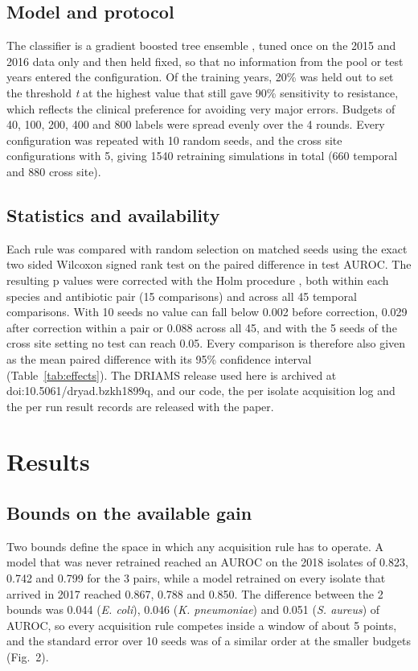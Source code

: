 \documentclass[conference,a4paper]{IEEEtran}
\begin{document}
\subsection{Model and protocol}

The classifier is a gradient boosted tree ensemble \cite{r19}, tuned once on the 2015 and 2016 data only and then held fixed, so that no information from the pool or test years entered the configuration. Of the training years, 20\% was held out to set the threshold \textit{t} at the highest value that still gave 90\% sensitivity to resistance, which reflects the clinical preference for avoiding very major errors. Budgets of 40, 100, 200, 400 and 800 labels were spread evenly over the 4 rounds. Every configuration was repeated with 10 random seeds, and the cross site configurations with 5, giving 1540 retraining simulations in total (660 temporal and 880 cross site).

\subsection{Statistics and availability}

Each rule was compared with random selection on matched seeds using the exact two sided Wilcoxon signed rank test on the paired difference in test AUROC. The resulting p values were corrected with the Holm procedure \cite{r20}, both within each species and antibiotic pair (15 comparisons) and across all 45 temporal comparisons. With 10 seeds no value can fall below 0.002 before correction, 0.029 after correction within a pair or 0.088 across all 45, and with the 5 seeds of the cross site setting no test can reach 0.05. Every comparison is therefore also given as the mean paired difference with its 95\% confidence interval (Table~\ref{tab:effects}). The DRIAMS release used here is archived at doi:10.5061/\allowbreak dryad.\allowbreak bzkh1899q, and our code, the per isolate acquisition log and the per run result records are released with the paper.

\section{Results}

\subsection{Bounds on the available gain}

Two bounds define the space in which any acquisition rule has to operate. A model that was never retrained reached an AUROC on the 2018 isolates of 0.823, 0.742 and 0.799 for the 3 pairs, while a model retrained on every isolate that arrived in 2017 reached 0.867, 0.788 and 0.850. The difference between the 2 bounds was 0.044 (\textit{E. coli}), 0.046 (\textit{K. pneumoniae}) and 0.051 (\textit{S. aureus}) of AUROC, so every acquisition rule competes inside a window of about 5 points, and the standard error over 10 seeds was of a similar order at the smaller budgets (Fig.~2).
\end{document}
